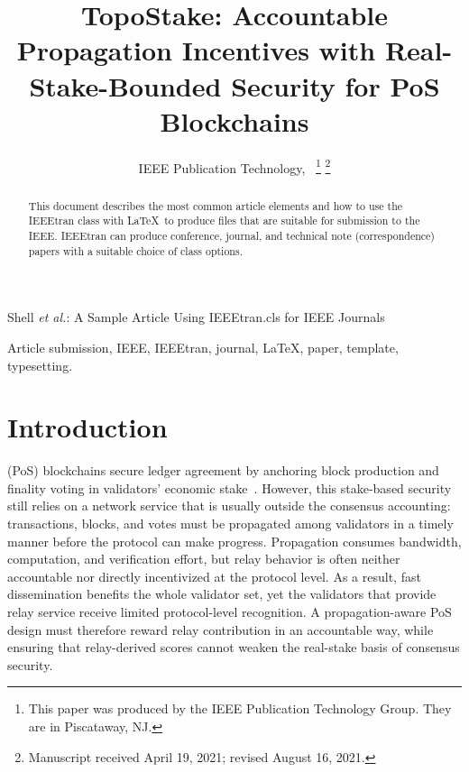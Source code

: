 \documentclass[lettersize,journal]{IEEEtran}
\begin{document}
\title{TopoStake: Accountable Propagation Incentives with Real-Stake-Bounded Security for PoS Blockchains}

\author{IEEE Publication Technology,~
\thanks{This paper was produced by the IEEE Publication Technology Group. They are in Piscataway, NJ.}%
\thanks{Manuscript received April 19, 2021; revised August 16, 2021.}}

%
{Shell \MakeLowercase{\textit{et al.}}: A Sample Article Using IEEEtran.cls for IEEE Journals}


\maketitle

\begin{abstract}
This document describes the most common article elements and how to use the IEEEtran class with \LaTeX \ to produce files that are suitable for submission to the IEEE.  IEEEtran can produce conference, journal, and technical note (correspondence) papers with a suitable choice of class options. 
\end{abstract}

\begin{IEEEkeywords}
Article submission, IEEE, IEEEtran, journal, \LaTeX, paper, template, typesetting.
\end{IEEEkeywords}

\section{Introduction}
\label{sec:intro}

 (PoS) blockchains secure ledger agreement by anchoring block production and finality voting in validators' economic stake~\cite{kiayias2017ouroboros,gilad2017algorand,buterin2017casper}.
However, this stake-based security still relies on a network service that is usually outside the consensus accounting: transactions, blocks, and votes must be propagated among validators in a timely manner before the protocol can make progress.
Propagation consumes bandwidth, computation, and verification effort, but relay behavior is often neither accountable nor directly incentivized at the protocol level.
As a result, fast dissemination benefits the whole validator set, yet the validators that provide relay service receive limited protocol-level recognition.
A propagation-aware PoS design must therefore reward relay contribution in an accountable way, while ensuring that relay-derived scores cannot weaken the real-stake basis of consensus security.
\end{document}
